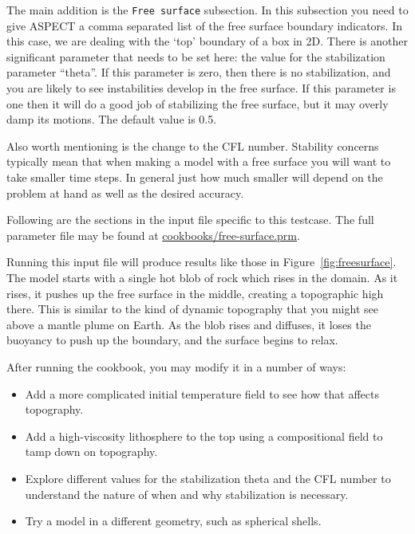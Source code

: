 \documentclass{article}
\newcommand{\aspect}{\textsc{ASPECT}}
\begin{document}
The main addition is the \texttt{Free surface} subsection.
In this subsection you need to give \aspect{} a comma
separated list of the free surface boundary indicators.  In this case, we are
dealing with the `top' boundary of a box in 2D.
There is another significant
parameter that needs to be set here: the value for the stabilization parameter ``theta''.
If this parameter is zero, then there is no stabilization, and you are likely to
see instabilities develop in the free surface.  If this parameter is one then it
will do a good job of stabilizing the free surface, but it may overly damp its 
motions.  The default value is 0.5.

Also worth mentioning is the change to the CFL number. Stability concerns typically 
mean that when making a model with a free surface you will want to take smaller 
time steps.  In general just how much smaller will depend on the problem at hand
as well as the desired accuracy.  

Following are the sections in the input file specific to this testcase.  The full parameter
file may be found at \url{cookbooks/free-surface.prm}.



Running this input file will produce results like those in Figure~\ref{fig:freesurface}.
The model starts with a single hot blob of rock which rises in the domain.  As it 
rises, it pushes up the free surface in the middle, creating a topographic high there.
This is similar to the kind of dynamic topography that you might see above a mantle 
plume on Earth.  As the blob rises and diffuses, it loses the buoyancy to push up 
the boundary, and the surface begins to relax.

After running the cookbook, you may modify it in a number of ways:
\begin{itemize}
\item Add a more complicated initial temperature field to see how that affects topography.
\item Add a high-viscosity lithosphere to the top using a compositional field to tamp down on topography.
\item Explore different values for the stabilization theta and the CFL number to understand the nature of when and why stabilization is necessary.
\item Try a model in a different geometry, such as spherical shells.
\end{itemize}
\end{document}
